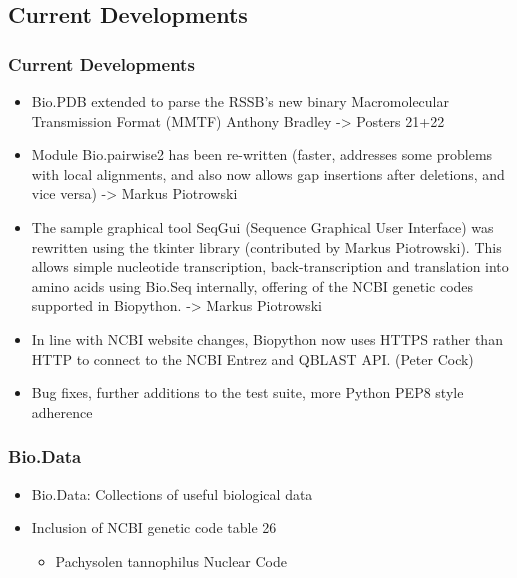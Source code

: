 \documentclass[trans]{beamer}
\begin{document}
\subsection*{Current Developments}
\frame
{
  \frametitle{Current Developments}

  \begin{itemize}
  \item Bio.PDB extended to parse the RSSB's new binary Macromolecular
Transmission Format (MMTF) Anthony Bradley -> Posters 21+22

  \item Module Bio.pairwise2 has been re-written (faster, addresses some problems with local alignments, and also now allows gap insertions after deletions, and vice versa) -> Markus Piotrowski

  \item The sample graphical tool SeqGui (Sequence Graphical User Interface) was
rewritten using the tkinter library (contributed by Markus Piotrowski). This
allows simple nucleotide transcription, back-transcription and translation
into amino acids using Bio.Seq internally, offering of the NCBI genetic codes
supported in Biopython. -> Markus Piotrowski

  \item In line with NCBI website changes, Biopython now uses HTTPS rather than HTTP
to connect to the NCBI Entrez and QBLAST API. (Peter Cock)

  \item Bug fixes, further additions to the test suite, more Python PEP8 style adherence

  \end{itemize}
}

\frame
{
  \frametitle{Bio.Data}
  
  \begin{itemize}
  \item Bio.Data: Collections of useful biological data
  \item Inclusion of NCBI genetic code table 26
  \begin{itemize}
  \item Pachysolen tannophilus Nuclear Code
  \end{itemize}
  \end{itemize}
}

\end{document}

